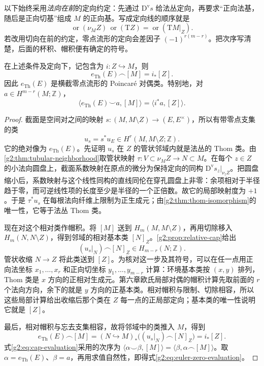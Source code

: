 \ProseParagraphBreak

以下始终采用\emph{法向在前}的定向约定：先通过 \(\mathrm D^{\mathrm v}s\) 给法丛定向，再要求“正向法基，随后是正向切基”组成 \(M\) 的正向基。写成定向线的顺序就是
\begin{equation}\label{g2:eq:euler-zero-orientation}
	\operatorname{or}(\nu_MZ)\,\operatorname{or}(\mathrm TZ)=\operatorname{or}(\mathrm TM|_Z).
\end{equation}
若改用切向在前的约定，零点流形的定向会差因子 \((-1)^{r(m-r)}\)。把次序写清楚，后面的杯积、帽积便有确定的符号。

\begin{theorem}\label{g2:thm:euler-transverse-zero-duality}
	在上述条件及定向下，记包含为 \(i:Z\hookrightarrow M\)，则
	\begin{equation}\label{g2:eq:euler-zero-dual}
		e_{\mathrm{Th}}(E)\frown[M]=i_*[Z].
	\end{equation}
	因此 \(e_{\mathrm{Th}}(E)\) 是横截零点流形的 Poincar\'e 对偶类。特别地，对 \(a\in H^{m-r}(M;\mathbb Z)\)，
	\begin{equation}\label{g2:eq:euler-zero-evaluation}
		\langle e_{\mathrm{Th}}(E)\smile a,[M]\rangle=\langle i^*a,[Z]\rangle.
	\end{equation}
\end{theorem}
\begin{proof}
	截面是空间对之间的映射 \(s:(M,M\setminus Z)\to(E,E^\times)\)，所以有带零点支集的类
	\[
		u_s=s^*u_E\in H^r(M,M\setminus Z;\mathbb Z).
	\]
	它的绝对像为 \(e_{\mathrm{Th}}(E)\)。先证明 \(u_s\) 在 \(Z\) 的管状邻域内就是法丛的 Thom 类。由\cref{g2:thm:tubular-neighborhood}取管状映射 \(\tau:V\subset\nu_MZ\to N\subset M\)。在每个 \(z\in Z\) 的小法向圆盘上，截面系数映射在原点的微分为保持定向的同构 \(\mathrm D^{\mathrm v}s_z|_{\nu_zZ}\)。把圆盘缩小后，系数映射与这个线性同构的直线同伦在穿孔圆盘上非零：余项相对于半径趋于零，而可逆线性项的长度至少是半径的一个正倍数。故它的局部映射度为 \(+1\)。于是 \(\tau^*u_s\) 在每根法向纤维上限制为正生成元；由\cref{g2:thm:thom-isomorphism}的唯一性，它等于法丛 Thom 类。

	现在对这个相对类作帽积。将 \([M]\) 送到 \(H_m(M,M\setminus Z)\)，再用切除移入 \(H_m(N,N\setminus Z)\)，得到邻域的相对基本类 \([N]_Z\)。\cref{g2:prop:relative-cap}给出
	\[
		(u_s|_N)\frown[N]_Z\in H_{m-r}(N;\mathbb Z).
	\]
	管状收缩 \(N\to Z\) 将此类送到 \([Z]\)。为核对这一步及其符号，可以在任一点用正向法坐标 \(x_1,\ldots,x_r\) 和正向切坐标 \(y_1,\ldots,y_{m-r}\) 计算：环境基本类按 \((x,y)\) 排列，Thom 类是 \(x\) 方向的正相对生成元。第六章欧氏局部对偶的帽积计算先取前面的 \(r\) 个法向方向，余下的就是 \(y\) 方向的正基本类。相对帽积与限制、切除相容，所以这些局部计算给出收缩后那个类在 \(Z\) 每一点的正局部定向；基本类的唯一性说明它就是 \([Z]\)。

	最后，相对帽积与忘去支集相容，故将邻域中的类推入 \(M\)，得到
	\[
		e_{\mathrm{Th}}(E)\frown[M]
		=(N\hookrightarrow M)_*\bigl((u_s|_N)\frown[N]_Z\bigr)=i_*[Z].
	\]
	式\eqref{g2:eq:cap-evaluation}采用的次序为 \(\langle\alpha\smile\beta,[M]\rangle=\langle\beta,\alpha\frown[M]\rangle\)。取 \(\alpha=e_{\mathrm{Th}}(E)\)、\(\beta=a\)，再用求值自然性，即得式\eqref{g2:eq:euler-zero-evaluation}。
\end{proof}

